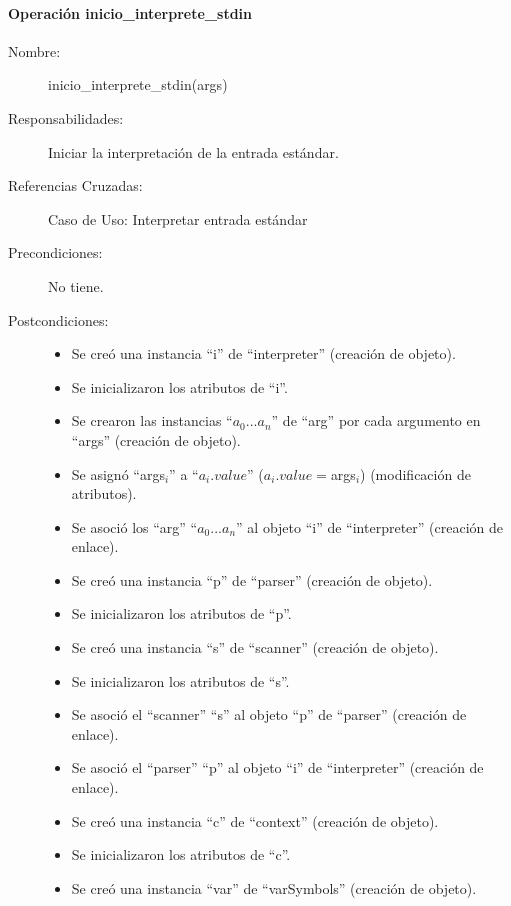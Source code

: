 \paragraph{Operación inicio\_interprete\_stdin}
\FloatBarrier
\begin{framed}
	\begin{description}
		\item [Nombre:] inicio\_interprete\_stdin(args)
		\item [Responsabilidades:] Iniciar la interpretación de la entrada estándar.
		\item [Referencias Cruzadas: ] Caso de Uso: Interpretar entrada estándar
      \item [Precondiciones:] No tiene.
      \item [Postcondiciones:] \hfill
      \begin {itemize}
         \item Se creó una instancia ``i'' de ``interpreter'' (creación de objeto).
         \item Se inicializaron los atributos de ``i''.
         \item Se crearon las instancias ``$a_0...a_n$'' de ``arg'' por cada argumento en ``args'' (creación de objeto).
         \item Se asignó ``args$_i$'' a ``$a_i.value$'' ($a_i.value = $args$_i$) (modificación de atributos).
         \item Se asoció los ``arg'' ``$a_0...a_n$'' al objeto ``i'' de ``interpreter'' (creación de enlace).
         \item Se creó una instancia ``p'' de ``parser'' (creación de objeto).
         \item Se inicializaron los atributos de ``p''.
         \item Se creó una instancia ``s'' de ``scanner'' (creación de objeto).
         \item Se inicializaron los atributos de ``s''.
         \item Se asoció el ``scanner'' ``s'' al objeto ``p'' de ``parser'' (creación de enlace).
         \item Se asoció el ``parser'' ``p'' al objeto ``i'' de ``interpreter'' (creación de enlace).
         \item Se creó una instancia ``c'' de ``context'' (creación de objeto).
         \item Se inicializaron los atributos de ``c''.
         \item Se creó una instancia ``var'' de ``varSymbols'' (creación de objeto).

\end{itemize}
\end{description}
\end{framed}
